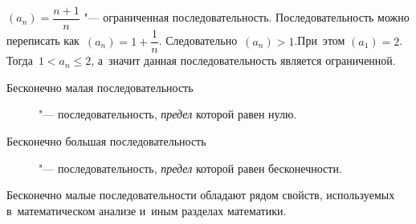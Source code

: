 \documentclass[]{scrartcl}
\begin{document}
{{\begin{Thexmpl}\label{ex:limited-sequence}
${\displaystyle (a_n)=\dfrac{n+1}{n}}$ "--- ограниченная последовательность. Последовательность можно переписать как~${\displaystyle (a_n)=1+\dfrac{1}{n}}$. Следовательно~${\displaystyle (a_n)>1}$.При~этом ${\displaystyle (a_1)=2}$. Тогда~${\displaystyle 1 < a_n \leq 2}$, а~значит данная последовательность является ограниченной.
\end{Thexmpl}

\begin{description}
	\item[Бесконечно малая последовательность] "--- последовательность, \emph{предел} которой равен нулю.
	\item[Бесконечно большая последовательность] "--- последовательность, \emph{предел} которой равен бесконечности.
\end{description}
Бесконечно малые последовательности обладают рядом свойств, используемых в~математическом анализе и~иным разделах математики.

}}
\end{document}
